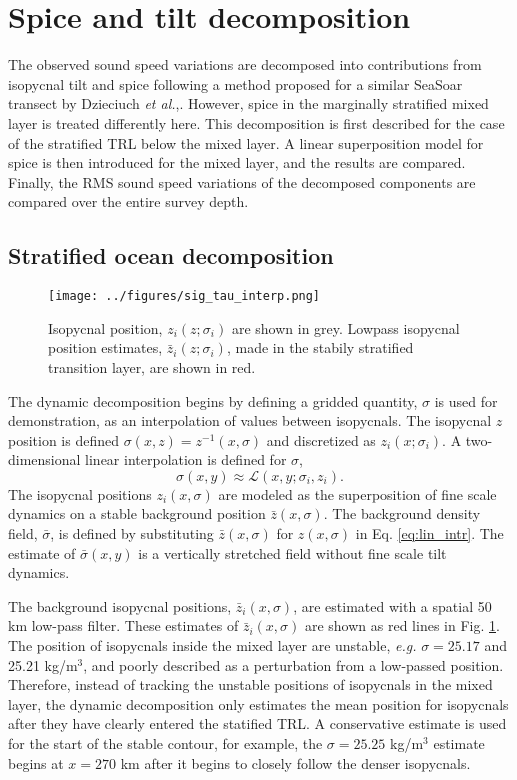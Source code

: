 \documentclass[preprint,NumberedRefs]{JASA}
\begin{document}
\section{\label{sec:decomposition}Spice and tilt decomposition}
The observed sound speed variations are decomposed into contributions from isopycnal tilt and spice following a method proposed for a similar SeaSoar transect by Dzieciuch \emph{et al.},\citep{dzieciuch2004}. However, spice in the marginally stratified mixed layer is treated differently here. This decomposition is first described for the case of the stratified TRL below the mixed layer. A linear superposition model for spice is then introduced for the mixed layer, and the results are compared. Finally, the RMS sound speed variations of the decomposed components are compared over the entire survey depth.

\subsection{Stratified ocean decomposition}
\begin{figure}
\texttt{[image: ../figures/sig\_tau\_interp.png]}
    \caption{\label{fig:cntrs}{Isopycnal position, $z_i(z; \sigma_i)$ are shown in grey. Lowpass isopycnal position estimates, $\bar{z}_i(z; \sigma_i)$, made in the stabily stratified transition layer, are shown in red.}}
\end{figure}

The dynamic decomposition begins by defining a gridded quantity, $\sigma$ is used for demonstration, as an interpolation of values between isopycnals. The isopycnal $z$ position is defined $\sigma(x, z) = z^{-1}(x, \sigma)$ and discretized as $z_i(x; \sigma_i)$. A two-dimensional linear interpolation is defined for $\sigma$,
\begin{equation}
    \sigma(x,y)\approx\mathcal{L}(x, y; \sigma_i, z_i).
    \label{eq:lin_intr}
\end{equation}
The isopycnal positions $z_i(x, \sigma)$ are modeled as the superposition of fine scale dynamics on a stable background position $\bar{z}(x, \sigma)$. The background density field, $\bar{\sigma}$, is defined by substituting $\bar{z}(x, \sigma)$ for $z(x, \sigma)$ in Eq. \eqref{eq:lin_intr}. The estimate of $\bar{\sigma}(x,y)$ is a vertically stretched field without fine scale tilt dynamics.

The background isopycnal positions, $\bar{z}_i(x, \sigma)$, are estimated with a spatial 50 km low-pass filter. These estimates of $\bar{z}_i(x, \sigma)$ are shown as red lines in Fig. \ref{fig:cntrs}. The position of isopycnals inside the mixed layer are unstable, \emph{e.g.} $\sigma=25.17$ and 25.21 kg/m$^3$, and poorly described as a perturbation from a low-passed position. Therefore, instead of tracking the unstable positions of isopycnals in the mixed layer, the dynamic decomposition only estimates the mean position for isopycnals after they have clearly entered the statified TRL. A conservative estimate is used for the start of the stable contour, for example, the $\sigma=25.25$ kg/m$^3$ estimate begins at $x=270$ km after it begins to closely follow the denser isopycnals.
\end{document}
